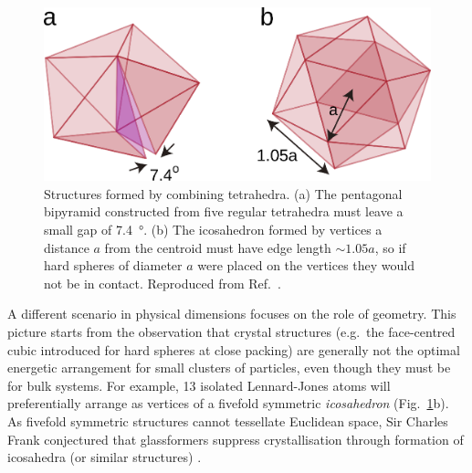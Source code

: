 \documentclass[11pt,twoside]{report}
\begin{document}


\begin{figure}
  \includegraphics[width=0.7\linewidth,outer]{frustration}
  \caption[Frustration of tetrahedral structures]{
    Structures formed by combining tetrahedra.
    (a) The pentagonal bipyramid constructed from five regular tetrahedra must leave a small gap of \SI{7.4}{\degree}.
    (b) The icosahedron formed by vertices a distance $a$ from the centroid must have edge length $\sim1.05 a$, so if hard spheres of diameter $a$ were placed on the vertices they would not be in contact.
    Reproduced from Ref.\ \cite{RoyallPR2015}.
  }
  \label{fig:frustration}
\end{figure}

A different scenario in physical dimensions focuses on the role of geometry.
This picture starts from the observation that crystal structures (e.g.\ the face-centred cubic introduced for hard spheres at close packing) are generally not the optimal energetic arrangement for small clusters of particles, even though they must be for bulk systems.
For example, 13 isolated Lennard-Jones atoms will preferentially arrange as vertices of a fivefold symmetric \emph{icosahedron} \cite{FrankPRS1952} (Fig.\ \ref{fig:frustration}b).
As fivefold symmetric structures cannot tessellate Euclidean space, Sir Charles Frank conjectured that glassformers suppress crystallisation through formation of icosahedra (or similar structures) \cite{FrankPRS1952}.
\end{document}
